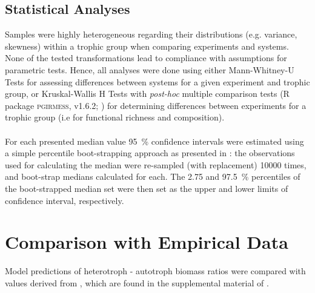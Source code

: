 \subsection{Statistical Analyses}
\label{chap:mat:analysis:stats}
Samples were highly heterogeneous regarding their distributions (e.g. variance, skewness) within a trophic group when comparing experiments and systems. None of the tested transformations lead to compliance with assumptions for parametric tests. Hence, all analyses were done using either Mann-Whitney-U Tests \citep{Hollander2013} for assessing differences between systems for a given experiment and trophic group, or 
Kruskal-Wallis H Tests with \textit{post-hoc} multiple comparison tests (R package \textsc{pgirmess}, v1.6.2; \citealp{Siegel1988}) for determining differences between experiments for a trophic group (i.e for functional richness and composition). \\\\
For each presented median value 95~\% confidence intervals were estimated using a simple percentile boot-strapping approach as presented in \cite{Carpenter2000}: the observations used for calculating the median were re-sampled (with replacement) 10000 times, and boot-strap medians calculated for each. The 2.75 and 97.5~\% percentiles of the boot-strapped median set were then set as the upper and lower limits of confidence interval, respectively. 
\section{Comparison with Empirical Data}
\label{chap:mat:emp}
Model predictions of heterotroph - autotroph biomass ratios were compared with values derived from \cite{Cebrian2009}, which are found in the supplemental material of \cite{Harfoot2014}.

